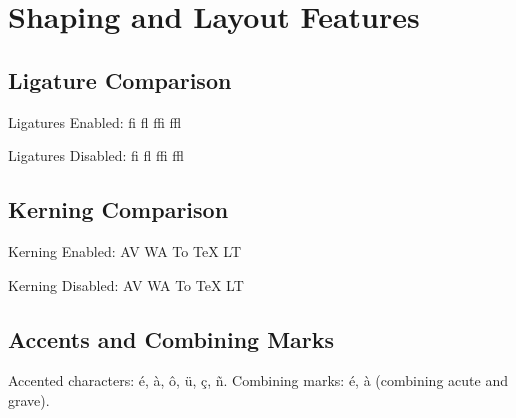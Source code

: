 \documentclass{article}
\begin{document}
\section*{Shaping and Layout Features}

\subsection*{Ligature Comparison}
Ligatures Enabled: {\fontligon fi fl ffi ffl}

Ligatures Disabled: {\fontligoff fi fl ffi ffl}

\subsection*{Kerning Comparison}
Kerning Enabled: {\fontligon AV WA To TeX LT}

Kerning Disabled: {\fontligoff AV WA To TeX LT}

\subsection*{Accents and Combining Marks}
Accented characters: \'e, \`a, \^o, \"u, \c{c}, \~n.
Combining marks: é, à (combining acute and grave).
\end{document}
